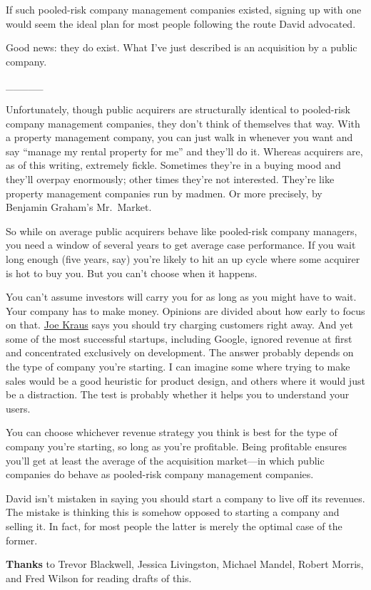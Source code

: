 If such pooled-risk company management companies existed, signing up
with one would seem the ideal plan for most people following the route
David advocated.

Good news: they do exist. What I've just described is an acquisition by
a public company.

\_\_\_\_\_

Unfortunately, though public acquirers are structurally identical to
pooled-risk company management companies, they don't think of themselves
that way. With a property management company, you can just walk in
whenever you want and say ``manage my rental property for me'' and
they'll do it. Whereas acquirers are, as of this writing, extremely
fickle. Sometimes they're in a buying mood and they'll overpay
enormously; other times they're not interested. They're like property
management companies run by madmen. Or more precisely, by Benjamin
Graham's Mr.~Market.

So while on average public acquirers behave like pooled-risk company
managers, you need a window of several years to get average case
performance. If you wait long enough (five years, say) you're likely to
hit an up cycle where some acquirer is hot to buy you. But you can't
choose when it happens.

You can't assume investors will carry you for as long as you might have
to wait. Your company has to make money. Opinions are divided about how
early to focus on that.
\href{http://susanitsa.wordpress.com/2006/11/08/the-joe-kraus-qa-better-late/}{Joe
Kraus} says you should try charging customers right away. And yet some
of the most successful startups, including Google, ignored revenue at
first and concentrated exclusively on development. The answer probably
depends on the type of company you're starting. I can imagine some where
trying to make sales would be a good heuristic for product design, and
others where it would just be a distraction. The test is probably
whether it helps you to understand your users.

You can choose whichever revenue strategy you think is best for the type
of company you're starting, so long as you're profitable. Being
profitable ensures you'll get at least the average of the acquisition
market---in which public companies do behave as pooled-risk company
management companies.

David isn't mistaken in saying you should start a company to live off
its revenues. The mistake is thinking this is somehow opposed to
starting a company and selling it. In fact, for most people the latter
is merely the optimal case of the former.

\textbf{Thanks} to Trevor Blackwell, Jessica Livingston, Michael Mandel,
Robert Morris, and Fred Wilson for reading drafts of this.

